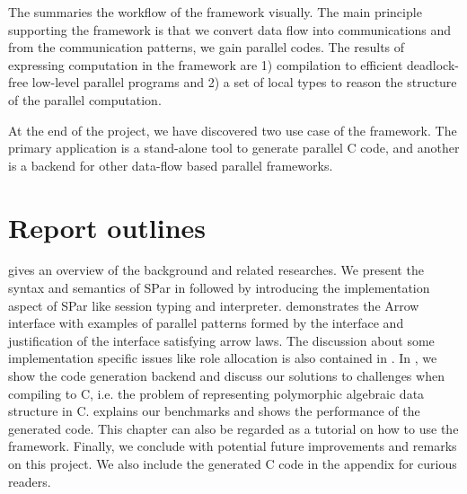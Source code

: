 The  summaries the workflow of the framework visually. The main principle supporting the framework is that we convert data flow into communications and from the communication patterns, we gain parallel codes. The results of expressing computation in the framework are 1) compilation to efficient deadlock-free low-level parallel programs and 2) a set of local types to reason the structure of the parallel computation.

At the end of the project, we have discovered two use case of the framework. The primary application is a stand-alone tool to generate parallel C code, and another is a backend for other data-flow based parallel frameworks. 

\section{Report outlines}

 gives an overview of the background and related researches. We present the syntax and semantics of SPar in  followed by  introducing the implementation aspect of SPar like session typing and interpreter.  demonstrates the Arrow interface with examples of parallel patterns formed by the interface and justification of the interface satisfying arrow laws. The discussion about some implementation specific issues like role allocation is also contained in . In , we show the code generation backend and discuss our solutions to challenges when compiling to C, i.e. the problem of representing polymorphic algebraic data structure in C.  explains our benchmarks and shows the performance of the generated code. This chapter can also be regarded as a tutorial on how to use the framework. Finally, we conclude with potential future improvements and remarks on this project. We also include the generated C code in the appendix for curious readers.